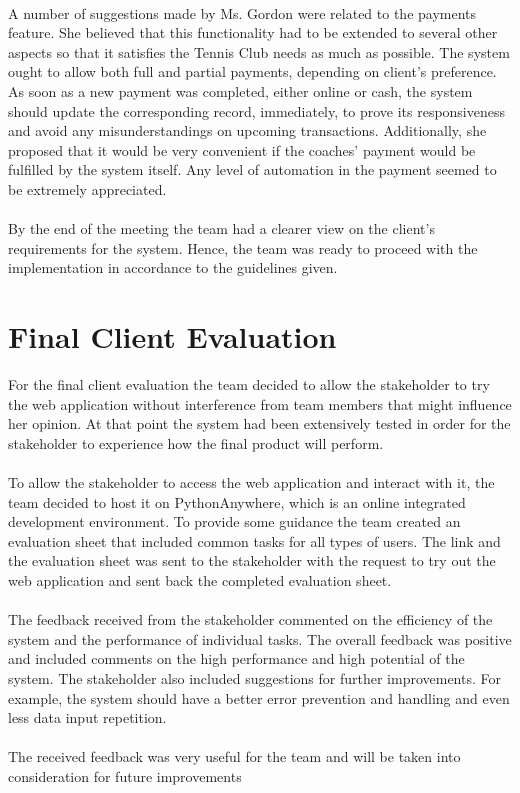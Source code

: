 \documentclass{l3proj}
\begin{document}
\\
A number of suggestions made by Ms. Gordon were related to the payments feature. She believed that this functionality had to be extended to several other aspects so that it satisfies the Tennis Club needs as much as possible. The system ought to allow both full and partial payments, depending on client's preference. As soon as a new payment was completed, either online or cash, the system should update the corresponding record, immediately, to prove its responsiveness and avoid any misunderstandings on upcoming transactions. Additionally, she proposed that it would be very convenient if the coaches' payment would be fulfilled by the system itself. Any level of automation in the payment seemed to be extremely appreciated.\\
\\
By the end of the meeting the team had a clearer view on the client's requirements for the system. Hence, the team was ready to proceed with the implementation in accordance to the guidelines given.




\section{Final Client Evaluation}
For the final client evaluation the team decided to allow the stakeholder to try the web application without interference from team members that might influence her opinion. At that point the system had been extensively tested in order for the stakeholder to experience how the final product will perform.\\
\\
To allow the stakeholder to access the web application and interact with it, the team decided to host it on PythonAnywhere, which is an online integrated development environment. To provide some guidance the team created an evaluation sheet that included common tasks for all types of users. The link and the evaluation sheet was sent to the stakeholder with the request to try out the web application and sent back the completed evaluation sheet.\\
\\
The feedback received from the stakeholder commented on the efficiency of the system and the performance of individual tasks. The overall feedback was positive and included comments on the high performance and high potential of the system. The stakeholder also included suggestions for further improvements. For example, the system should have a better error prevention and handling and even less data input repetition.\\
\\The received feedback was very useful for the team and will be taken into consideration for future improvements
\end{document}

